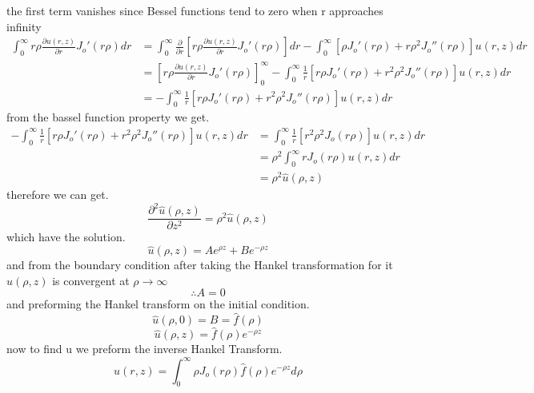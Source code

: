 \documentclass[]{article}
\begin{document}
the first term vanishes since Bessel functions tend to zero when r approaches infinity
\begin{align*}
\int_{0}^{\infty} r\rho\frac{\partial u(r,z)}{\partial r} J_o'(r\rho)dr
&= \int_{0}^{\infty} \frac{\partial}{\partial r}\left[ r\rho\frac{\partial u(r,z)}{\partial r} J_o'(r\rho)\right]dr 
- \int_{0}^{\infty} \left[\rho J_o'(r\rho)+ r\rho^2 J_o''(r\rho)\right] u(r,z)dr
\\
&= \left[ r\rho\frac{\partial u(r,z)}{\partial r} J_o'(r\rho)\right]_{0}^{\infty} - \int_{0}^{\infty} \frac{1}{r}\left[r\rho J_o'(r\rho)+ r^2\rho^2 J_o''(r\rho)\right] u(r,z)dr
\\
&= - \int_{0}^{\infty} \frac{1}{r}\left[r\rho J_o'(r\rho)+ r^2\rho^2 J_o''(r\rho)\right] u(r,z)dr
\end{align*}
from the bassel function property we get.
\begin{align*}
- \int_{0}^{\infty} \frac{1}{r}\left[r\rho J_o'(r\rho)+ r^2\rho^2 J_o''(r\rho)\right] u(r,z)dr &= \int_{0}^{\infty} \frac{1}{r}\left[r^2\rho^2 J_o(r\rho)\right] u(r,z)dr
\\
&= \rho^2 \int_{0}^{\infty} r J_o(r\rho) u(r,z)dr
\\
&= \rho^2 \hat{u}(\rho,z)
\end{align*}
therefore we can get.
\[
    \frac{\partial^2 \hat{u}(\rho,z)}{\partial z^2} = \rho^2 \hat{u}(\rho,z)    
\]
which have the solution. 
\[
\hat{u}(\rho,z) = A e^{\rho z} + Be^{-\rho z}    
\]
and from the boundary condition after taking the Hankel transformation for it $\hat{u}(\rho,z)$ is convergent at $\rho \to \infty$
\[
\therefore A = 0    
\]
and preforming the Hankel transform on the initial condition.
\[
\hat{u}(\rho,0) = B = \hat{f}(\rho)    
\]
\[
\hat{u}(\rho,z) = \hat{f}(\rho)e^{-\rho z}    
\]
now to find u we preform the inverse Hankel Transform.
\[
u(r,z) = \int_{0}^{\infty} \rho J_o(r\rho)\hat{f}(\rho)e^{-\rho z} d\rho    
\]

\newpage
\setcounter{equation}{0}
\end{document}
